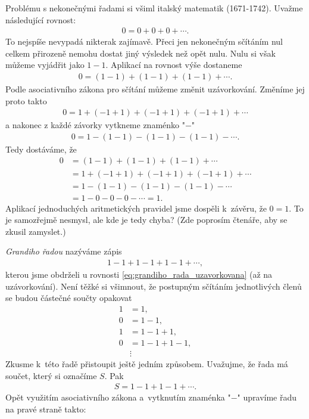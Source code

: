 Problému s nekonečnými řadami si všiml italský matematik  \mbox{(1671-1742)}. Uvažme následující rovnost:
\begin{align*}
0=0+0+0+\cdots .
\end{align*}
To nejspíše nevypadá nikterak zajímavě. Přeci jen nekonečným sčítáním nul celkem přirozeně nemohu dostat jiný výsledek než opět nulu. Nulu si však můžeme vyjádřit jako $1-1$. Aplikací na rovnost výše dostaneme
\begin{align}
\label{eq:grandiho_rada_uzavorkovana}
0=(1-1)+(1-1)+(1-1)+\cdots .
\end{align}
Podle asociativního zákona pro sčítání můžeme změnit uzávorkování. Změníme jej proto takto
\begin{align*}
0=1+(-1+1)+(-1+1)+(-1+1)+\cdots
\end{align*}
a nakonec z každé závorky vytkneme znaménko "$-$"
\begin{align*}
0=1-(1-1)-(1-1)-(1-1)-\cdots .
\end{align*}
Tedy dostáváme, že
\begin{align*}
0&=(1-1)+(1-1)+(1-1)+\cdots \\ &= 1+(-1+1)+(-1+1)+(-1+1)+\cdots \\ &= 1-(1-1)-(1-1)-(1-1)-\cdots \\ &= 1-0-0-0-\cdots = 1 .
\end{align*}
Aplikací jednoduchých aritmetických pravidel jsme dospěli k~závěru, že $0=1$. To je samozřejmě nesmysl, ale kde je tedy chyba? (Zde poprosím čtenáře, aby se zkusil zamyslet.)\par
\emph{Grandiho řadou} nazýváme zápis
\begin{align*}
1-1+1-1+1-1+\cdots ,
\end{align*}
kterou jsme obdrželi u rovnosti \eqref{eq:grandiho_rada_uzavorkovana} (až na uzávorkování). Není těžké si všimnout, že postupným sčítáním jednotlivých členů se budou částečné součty opakovat
\begin{align*}
1&=1 ,\\
0&=1-1 ,\\
1&=1-1+1 ,\\
0&=1-1+1-1 ,\\
&\vdots
\end{align*}
Zkusme k~této řadě přistoupit ještě jedním způsobem. Uvažujme, že řada má součet, který si označíme $S$. Pak
\begin{align*}
S=1-1+1-1+\cdots .
\end{align*}
Opět využitím asociativního zákona a~vytknutím znaménka "$-$" upravíme řadu na pravé straně takto:
